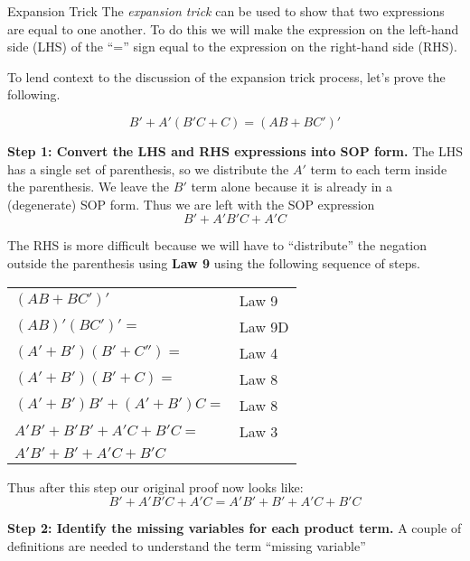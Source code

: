 \begin{process}{Expansion Trick}
\label{process:representationsExpansionTrick}
The \textit{expansion trick} can be used to show that two expressions are
equal to one another.  To do this we will make the expression on the
left-hand side (LHS) of the ``='' sign equal to the expression on the
right-hand side (RHS).

To lend context to the discussion of the expansion trick process, let's prove
the following.

\begin{equation}
\label{equ:representationsBullDozerStep0}
B' + A'(B'C + C) = (AB + BC')'
\end{equation}

\textbf{Step 1: Convert the LHS and RHS expressions into SOP form.}
The LHS has a single set of parenthesis, so we distribute the $A'$ term to each
term inside the parenthesis.  We leave the $B'$ term alone because it is already
in a (degenerate) SOP form.  Thus we are left with the SOP expression
$$B' + A'B'C + A'C$$

The RHS is more difficult because we will have to ``distribute'' the negation outside the
parenthesis using \textbf{Law 9} using the following sequence of steps.

\begin{tabular}[ht]{ll}
$(AB + BC')'$                     & Law 9    \\
$(AB)' (BC')'=$                    & Law 9D     \\
$(A' + B') (B' + C'') =$            & Law 4     \\
$(A' + B') (B' + C) =$                & Law 8     \\
$(A' + B') B' + (A' + B') C =$        & Law 8     \\
$A'B' + B'B' + A'C + B'C =$        & Law 3     \\
$A'B' + B' + A'C + B'C $                &      \\
\end{tabular}

Thus after this step our original proof now looks like:
\begin{equation}
\label{equ:representationsBullDozerStep1}
B' + A'B'C + A'C = A'B' + B' + A'C  + B'C
\end{equation}

\textbf{Step 2: Identify the missing variables for each product term.}
A couple of definitions are needed to understand the term ``missing variable''


\end{process}
